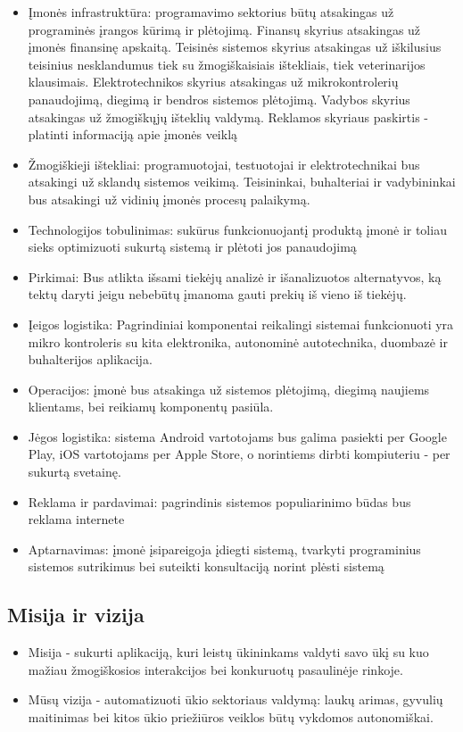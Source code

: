 \documentclass[oneside]{VUMIFPSkursinis}
\begin{document}
	\begin{itemize}
		\item{Įmonės infrastruktūra: programavimo sektorius būtų atsakingas už programinės įrangos kūrimą ir plėtojimą. Finansų skyrius atsakingas už įmonės finansinę apskaitą. Teisinės sistemos skyrius atsakingas už iškilusius teisinius nesklandumus tiek su žmogiškaisiais ištekliais, tiek veterinarijos klausimais. Elektrotechnikos skyrius atsakingas už mikrokontrolerių panaudojimą, diegimą ir bendros sistemos plėtojimą. Vadybos skyrius atsakingas už žmogiškųjų išteklių valdymą. Reklamos skyriaus paskirtis - platinti informaciją apie įmonės veiklą }
		\item{Žmogiškieji ištekliai: programuotojai, testuotojai ir elektrotechnikai bus atsakingi už sklandų sistemos veikimą. Teisininkai, buhalteriai ir vadybininkai bus atsakingi už vidinių įmonės procesų palaikymą. }
		\item{Technologijos tobulinimas: sukūrus funkcionuojantį produktą įmonė ir toliau sieks optimizuoti sukurtą sistemą ir plėtoti jos panaudojimą }
		\item{Pirkimai: Bus atlikta išsami tiekėjų analizė ir išanalizuotos alternatyvos, ką tektų daryti jeigu nebebūtų įmanoma gauti prekių iš vieno iš tiekėjų.}
		\item{Įeigos logistika: Pagrindiniai komponentai reikalingi sistemai funkcionuoti yra mikro kontroleris su kita elektronika, autonominė autotechnika, duombazė ir buhalterijos aplikacija.}
		\item{Operacijos: įmonė bus atsakinga už sistemos plėtojimą, diegimą naujiems klientams, bei reikiamų komponentų pasiūla.}
		\item{Jėgos logistika: sistema Android vartotojams bus galima pasiekti per Google Play, iOS vartotojams per Apple Store, o norintiems dirbti kompiuteriu - per sukurtą svetainę.}
		\item{Reklama ir pardavimai: pagrindinis sistemos populiarinimo būdas bus reklama internete}
		\item{Aptarnavimas: įmonė įsipareigoja įdiegti sistemą, tvarkyti programinius sistemos sutrikimus bei suteikti konsultaciją norint plėsti sistemą }
	\end{itemize}

	
\subsection{Misija ir vizija}
\begin{itemize}
\item Misija - sukurti aplikaciją, kuri leistų ūkininkams valdyti savo ūkį su kuo mažiau žmogiškosios interakcijos bei konkuruotų pasaulinėje rinkoje.
\item Mūsų vizija - automatizuoti ūkio sektoriaus valdymą: laukų arimas, gyvulių maitinimas bei kitos ūkio priežiūros veiklos būtų vykdomos autonomiškai.
\end{itemize}
\end{document}
